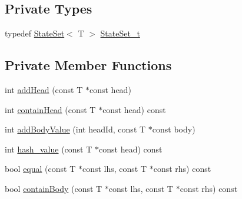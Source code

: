 \subsection*{Private Types}
\begin{DoxyCompactItemize}
\item 
typedef \mbox{\hyperlink{classgraphsat_1_1_state_set}{State\+Set}}$<$ T $>$ \mbox{\hyperlink{classgraphsat_1_1_state_set_a6474a59203fade7146aacfd0e277ecf4}{State\+Set\+\_\+t}}
\end{DoxyCompactItemize}
\subsection*{Private Member Functions}
\begin{DoxyCompactItemize}
\item 
int \mbox{\hyperlink{classgraphsat_1_1_state_set_a3d7046e995575e5bf9806b174ec75a65}{add\+Head}} (const T $\ast$const head)
\item 
int \mbox{\hyperlink{classgraphsat_1_1_state_set_ab499cfa88c12fedc5d0b6ae8e60ee1e9}{contain\+Head}} (const T $\ast$const head) const
\item 
int \mbox{\hyperlink{classgraphsat_1_1_state_set_a2a7f602339d0ef9c428da2333a93199f}{add\+Body\+Value}} (int head\+Id, const T $\ast$const body)
\item 
int \mbox{\hyperlink{classgraphsat_1_1_state_set_aaf7bbbad618682dd6d747b1c388d4995}{hash\+\_\+value}} (const T $\ast$const head) const
\item 
bool \mbox{\hyperlink{classgraphsat_1_1_state_set_ac293557e5cfc90cea8c75ee76a3d56cb}{equal}} (const T $\ast$const lhs, const T $\ast$const rhs) const
\item 
bool \mbox{\hyperlink{classgraphsat_1_1_state_set_ac83a9a8a89c6976ba650fc6b221c4cf0}{contain\+Body}} (const T $\ast$const lhs, const T $\ast$const rhs) const
\end{DoxyCompactItemize}
